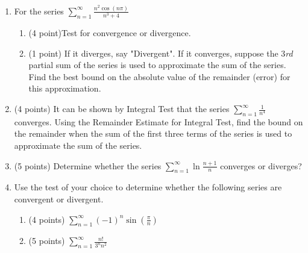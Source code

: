 \documentclass[paper=a4, fontsize=11pt]{scrartcl} %
\newcommand{\ds}{\displaystyle}
\numberwithin{equation}{section} %
\numberwithin{figure}{section} %
\numberwithin{table}{section} %
\begin{document}
\begin{enumerate}
\item For the series $\ds\sum_{n=1}^{\infty}\frac{n^2\cos(n\pi)}{n^3+4}$
\begin{enumerate} 
\item (4 point)\hspace{4mm}Test for convergence or divergence.
\vspace{4.5in}
\item (1 point)\hspace{4mm} If it diverges, say "Divergent". If it converges, suppose the 3\textit{rd} partial sum of the series is used to approximate the sum of the series. Find the best bound on the absolute value of the remainder (error) for this approximation.
\vspace{2.5in}
\end{enumerate}

\newpage
\item (4 points) It can be shown by Integral Test that the series $\ds\sum_{n=1}^{\infty}\frac{1}{n^4}$ converges. Using the Remainder Estimate for Integral Test, find the bound on the remainder when the sum of the first three terms of the series is used to approximate the sum of the series.
\vspace{3.5in}
\item (5 points) Determine whether the series $\ds \sum_{n=1}^{\infty}\ds\ln\frac{n+1}{n}$ converges or diverges?
\newpage
\item  Use the test of your choice to determine whether the following series are convergent or divergent.
\begin{enumerate}
\item (4 points) $\sum\limits_{n=1}^\infty (-1)^n \sin \left( \frac{\pi}{n} \right)$
\vspace{3.5in}
\item (5 points) $\ds\sum_{n=1}^{\infty}\frac{n!}{3^nn^2}$
\end{enumerate}


\end{enumerate}

\end{document}
